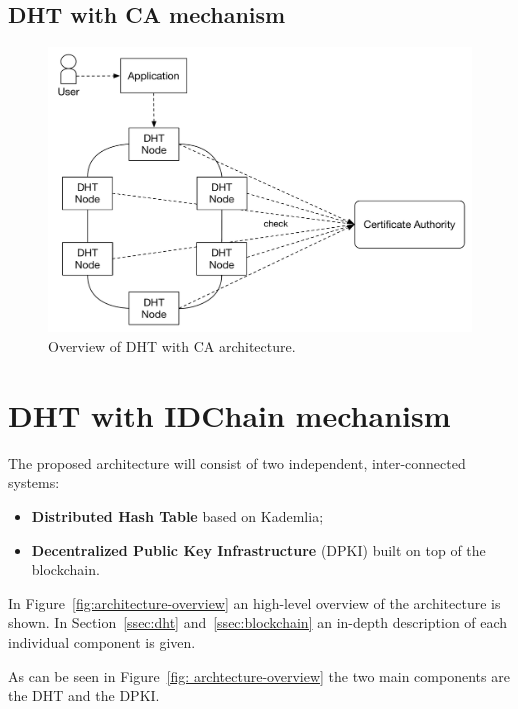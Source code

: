 \subsection{DHT with \ac{CA} mechanism}\label{architecture:ca-overview}

\begin{figure}
  \includegraphics[width=\linewidth]{Figures/architecture-overview-ca.pdf}
  \caption{Overview of DHT with CA architecture.}
\label{fig:architecture-ca-overview}
\end{figure}

\section{DHT with IDChain mechanism}\label{architecture:idchain-overview}

The proposed architecture will consist of two independent, inter-connected systems:

\begin{itemize}
	\item \textbf{Distributed Hash Table} based on Kademlia;
	\item \textbf{Decentralized Public Key Infrastructure} (DPKI) built on top of the blockchain.
\end{itemize}


In Figure~\ref{fig:architecture-overview} an high-level overview of the architecture is shown.
In Section~\ref{ssec:dht} and~\ref{ssec:blockchain} an in-depth description of each individual component is given.

As can be seen in Figure~\ref{fig: archtecture-overview} the two main components are the \ac{DHT} and the \ac{DPKI}.

